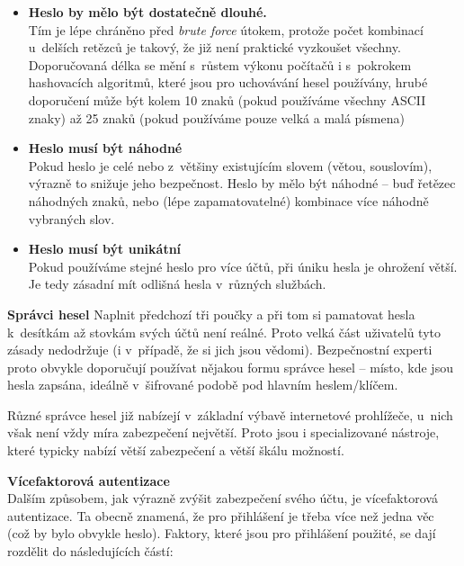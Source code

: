 \begin{itemize}
	\item \textbf{Heslo by mělo být dostatečně dlouhé.}\\
	Tím je lépe chráněno před \textit{brute force} útokem, protože počet kombinací u~delších retězců je takový, že již není praktické vyzkoušet všechny. Doporučovaná délka se mění s~růstem výkonu počítačů i s~pokrokem hashovacích algoritmů, které jsou pro uchovávání hesel používány, hrubé doporučení může být kolem 10 znaků (pokud používáme všechny ASCII znaky) až 25 znaků (pokud používáme pouze velká a malá písmena)

	\item \textbf{Heslo musí být náhodné}\\
	Pokud heslo je celé nebo z~většiny existujícím slovem (větou, souslovím), výrazně to snižuje jeho bezpečnost. Heslo by mělo být náhodné -- buď řetězec náhodných znaků, nebo (lépe zapamatovatelné) kombinace více náhodně vybraných slov.

	\item \textbf{Heslo musí být unikátní}\\
	Pokud používáme stejné heslo pro více účtů, při úniku hesla je ohrožení větší. Je tedy zásadní mít odlišná hesla v~různých službách. 

\end{itemize}

\textbf{Správci hesel}
Naplnit předchozí tři poučky a při tom si pamatovat hesla k~desítkám až stovkám svých účtů není reálné. Proto velká část uživatelů tyto zásady nedodržuje (i v~případě, že si jich jsou vědomi). Bezpečnostní experti proto obvykle doporučují používat nějakou formu správce hesel -- místo, kde jsou hesla zapsána, ideálně v~šifrované podobě pod hlavním heslem/klíčem.

Různé správce hesel již nabízejí v~základní výbavě internetové prohlížeče, u~nich však není vždy míra zabezpečení největší. Proto jsou i specializované nástroje, které typicky nabízí větší zabezpečení a větší škálu možností.

\textbf{Vícefaktorová autentizace}\\
Dalším způsobem, jak výrazně zvýšit zabezpečení svého účtu, je vícefaktorová autentizace. Ta obecně znamená, že pro přihlášení je třeba více než jedna věc (což by bylo obvykle heslo). Faktory, které jsou pro přihlášení použité, se dají rozdělit do následujících částí:

